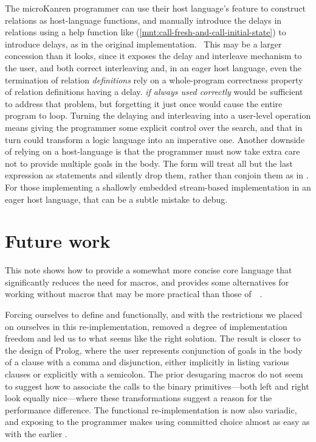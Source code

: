 \documentclass[sigplan,balance=true,pbalance=true,natbib=false]{acmart}
\begin{document}
The microKanren programmer can use their host language's
 feature to construct relations as host-language
functions, and manually introduce the delays in relations using a help
function like 
(\cref{mnt:call-fresh-and-call-initial-state}) to introduce delays, as
in the original implementation.~\cite{hemann2013muKanren} This may be
a larger concession than it looks, since it exposes the delay and
interleave mechanism to the user, and both correct interleaving and,
in an eager host language, even the termination of relation
\emph{definitions} rely on a whole-program correctness property of
relation definitions having a delay.  \emph{if always
  used correctly} would be sufficient to address that problem, but
forgetting it just once would cause the entire program to loop.
Turning the delaying and interleaving into a user-level operation
means giving the programmer some explicit control over the search, and
that in turn could transform a logic language into an imperative one.
Another downside of relying on a host-language  is
that the programmer must now take extra care not to provide multiple
goals in the body. The  form will treat all but the
last expression as statements and silently drop them, rather than
conjoin them as in . For those implementing a
shallowly embedded stream-based implementation in an eager host
language, that can be a subtle mistake to debug.

\section{Future work}\label{sec:conclusion}

This note shows how to provide a somewhat more concise core language
that significantly reduces the need for macros, and provides some
alternatives for working without macros that may be more practical
than those
of~\citeauthor{hemann2013muKanren}~\cite{hemann2013muKanren}.

Forcing ourselves to define  and 
functionally, and with the restrictions we placed on ourselves in this
re-implementation, removed a degree of implementation freedom and led
us to what seems like the right solution. The result is closer to the
design of Prolog, where the user represents conjunction of goals in
the body of a clause with a comma and disjunction, either implicitly
in listing various clauses or explicitly with a semicolon. The prior
desugaring macros do not seem to suggest how to associate the calls to
the binary primitives---both left and right look equally nice---where
these transformations suggest a reason for the performance difference.
The functional  re-implementation is now also
variadic, and exposing  to the programmer makes using
committed choice almost as easy as with the
earlier .
\end{document}
